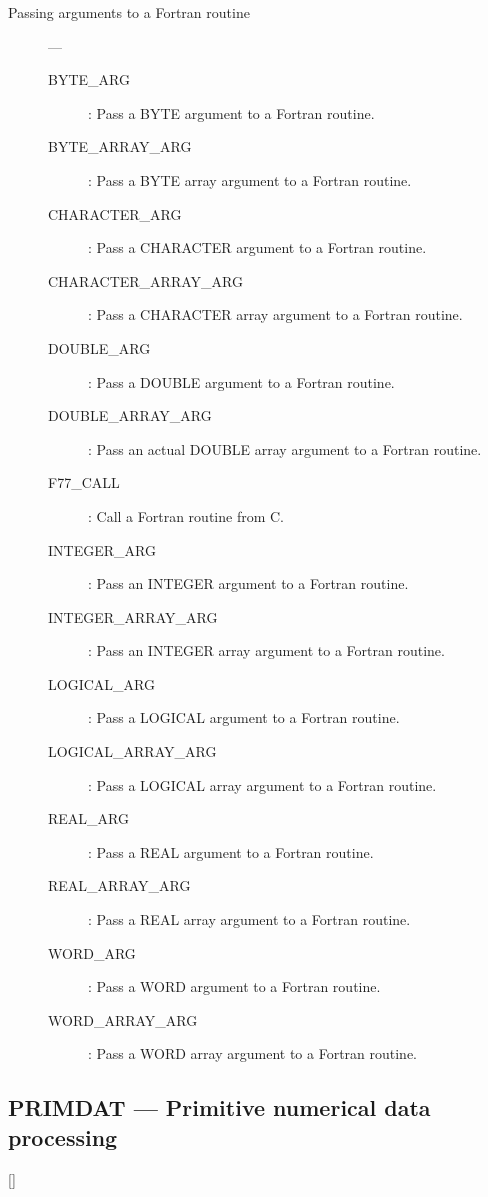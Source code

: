 \begin{description}
\item [Passing arguments to a Fortran routine] ---

\begin{description}
\item [BYTE\_ARG] : Pass a BYTE argument to a Fortran routine.
\item [BYTE\_ARRAY\_ARG] : Pass a BYTE array argument to a Fortran routine.
\item [CHARACTER\_ARG] : Pass a CHARACTER argument to a Fortran routine.
\item [CHARACTER\_ARRAY\_ARG] : Pass a CHARACTER array argument to a Fortran routine.
\item [DOUBLE\_ARG] : Pass a DOUBLE argument to a Fortran routine.
\item [DOUBLE\_ARRAY\_ARG] : Pass an actual DOUBLE array argument to a Fortran routine.
\item [F77\_CALL] : Call a Fortran routine from C.
\item [INTEGER\_ARG] : Pass an INTEGER argument to a Fortran routine.
\item [INTEGER\_ARRAY\_ARG] : Pass an INTEGER array argument to a Fortran routine.
\item [LOGICAL\_ARG] : Pass a LOGICAL argument to a Fortran routine.
\item [LOGICAL\_ARRAY\_ARG] : Pass a LOGICAL array argument to a Fortran routine.
\item [REAL\_ARG] : Pass a REAL argument to a Fortran routine.
\item [REAL\_ARRAY\_ARG] : Pass a REAL array argument to a Fortran routine.
\item [WORD\_ARG] : Pass a WORD argument to a Fortran routine.
\item [WORD\_ARRAY\_ARG] : Pass a WORD array argument to a Fortran routine.
\end{description}

\end{description}

\newpage

\subsection{PRIMDAT --- Primitive numerical data processing} 

\vspace{-9mm}

\hfill []

\vspace{2mm}

